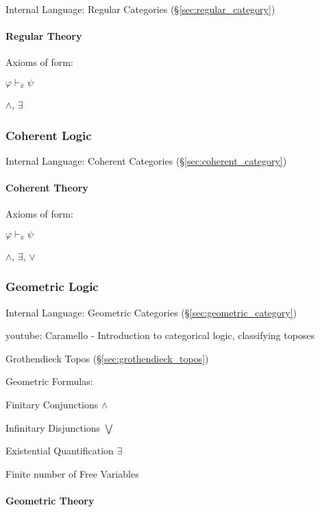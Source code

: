 Internal Language: Regular Categories (\S\ref{sec:regular_category})



\paragraph{Regular Theory}\label{sec:regular_theory}\hfill

Axioms of form:

$\varphi \vdash_{\overline{x}} \psi$

$\wedge$, $\exists$



\subsubsection{Coherent Logic}\label{sec:coherent_logic}

Internal Language: Coherent Categories (\S\ref{sec:coherent_category})



\paragraph{Coherent Theory}\label{sec:coherent_theory}\hfill

Axioms of form:

$\varphi \vdash_{\overline{x}} \psi$

$\wedge$, $\exists$, $\vee$



\subsubsection{Geometric Logic}\label{sec:geometric_logic}

Internal Language: Geometric Categories
(\S\ref{sec:geometric_category})


youtube: Caramello - Introduction to categorical logic, classifying
toposes

Grothendieck Topos (\S\ref{sec:grothendieck_topos})

Geometric Formulas:

Finitary Conjunctions $\wedge$

Infinitary Disjunctions $\bigvee$

Existential Quantification $\exists$

Finite number of Free Variables



\paragraph{Geometric Theory}\label{sec:geometric_theory}\hfill

